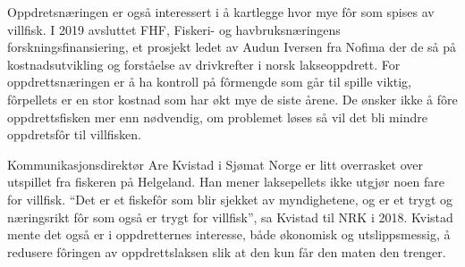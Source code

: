 Oppdretsnæringen er også interessert i å kartlegge hvor mye fôr som spises av villfisk. I 2019 avsluttet FHF, Fiskeri- og havbruksnæringens forskningsfinansiering, et prosjekt ledet av Audun Iversen fra Nofima der de så på kostnadsutvikling og forståelse av drivkrefter i norsk lakseoppdrett. For oppdrettsnæringen er å ha kontroll på fôrmengde som går til spille viktig, fôrpellets er en stor kostnad som har økt mye de siste årene. De ønsker ikke å fôre oppdrettsfisken mer enn nødvendig, om problemet løses så vil det bli mindre oppdretsfôr til villfisken. \cite{Baevre-Jensen 2019}


Kommunikasjonsdirektør Are Kvistad i Sjømat Norge er litt overrasket over utspillet fra fiskeren på Helgeland. Han mener laksepellets ikke utgjør noen fare for villfisk. ``Det er et fiskefôr som blir sjekket av myndighetene, og er et trygt og næringsrikt fôr som også er trygt for villfisk'', sa Kvistad til NRK i 2018. Kvistad mente det også er i oppdretternes interesse, både økonomisk og utslippsmessig, å redusere fôringen av oppdrettslaksen slik at den kun får den maten den trenger. \cite{Olsen m.fl. 2018}



